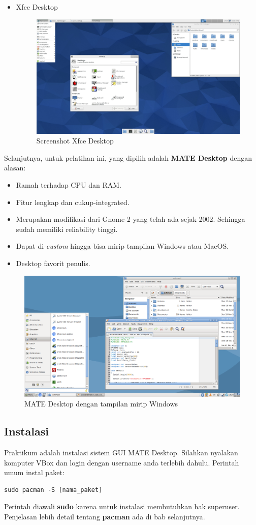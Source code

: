 \documentclass[12pt,]{article}
\begin{document}
\begin{itemize}
		\item Xfce Desktop
		\begin{figure}[H]
			\centering
			\includegraphics[width=0.8\linewidth]{images/vbox_de/xfce}
			\caption{Screenshot Xfce Desktop}
		\end{figure}
	\end{itemize}

	Selanjutnya, untuk pelatihan ini, yang dipilih adalah \textbf{MATE Desktop} dengan alasan:
	\begin{itemize}
		\item Ramah terhadap CPU dan RAM.
		\item Fitur lengkap dan cukup-integrated.
		\item Merupakan modifikasi dari Gnome-2 yang telah ada sejak 2002.
		Sehingga sudah memiliki reliability tinggi.
		\item Dapat di-\textit{custom} hingga bisa mirip tampilan Windows atau MacOS.
		\item Desktop favorit penulis.
	\end{itemize} 
	\begin{figure}[H]
		\centering
		\includegraphics[width=0.8\linewidth]{images/vbox_de/mymate}
		\caption{MATE Desktop dengan tampilan mirip Windows}
	\end{figure} 
	
	\subsection{Instalasi}
	Praktikum adalah instalasi sistem GUI MATE Desktop.
	Silahkan nyalakan komputer VBox dan login dengan username anda terlebih dahulu.
	Perintah umum instal paket:
	\begin{verbatim}
sudo pacman -S [nama_paket]
	\end{verbatim}
	Perintah diawali \textbf{sudo} karena untuk instalasi membutuhkan hak superuser.
	Penjelasan lebih detail tentang \textbf{pacman} ada di bab selanjutnya.
	
\end{document}
